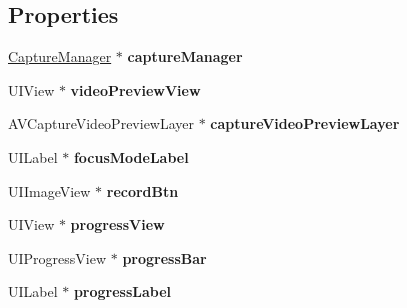\subsection*{Properties}
\begin{DoxyCompactItemize}
\item 
\hypertarget{category_k_z_camera_view_07_08_a202ff49b661861c8081b7f411008a7b7}{}\hyperlink{interface_capture_manager}{Capture\+Manager} $\ast$ {\bfseries capture\+Manager}\label{category_k_z_camera_view_07_08_a202ff49b661861c8081b7f411008a7b7}

\item 
\hypertarget{category_k_z_camera_view_07_08_ade4bbfffec8ef7634e9141f4aee79478}{}U\+I\+View $\ast$ {\bfseries video\+Preview\+View}\label{category_k_z_camera_view_07_08_ade4bbfffec8ef7634e9141f4aee79478}

\item 
\hypertarget{category_k_z_camera_view_07_08_aabdee2e18cb4074c218bf6b0b893eeb7}{}A\+V\+Capture\+Video\+Preview\+Layer $\ast$ {\bfseries capture\+Video\+Preview\+Layer}\label{category_k_z_camera_view_07_08_aabdee2e18cb4074c218bf6b0b893eeb7}

\item 
\hypertarget{category_k_z_camera_view_07_08_ab3a487d5969b702a208f641f13f2af19}{}U\+I\+Label $\ast$ {\bfseries focus\+Mode\+Label}\label{category_k_z_camera_view_07_08_ab3a487d5969b702a208f641f13f2af19}

\item 
\hypertarget{category_k_z_camera_view_07_08_a5b621375f9c96b2f2a57d246aebf7fc5}{}U\+I\+Image\+View $\ast$ {\bfseries record\+Btn}\label{category_k_z_camera_view_07_08_a5b621375f9c96b2f2a57d246aebf7fc5}

\item 
\hypertarget{category_k_z_camera_view_07_08_ab22146d5b06302170e106d0c672537d4}{}U\+I\+View $\ast$ {\bfseries progress\+View}\label{category_k_z_camera_view_07_08_ab22146d5b06302170e106d0c672537d4}

\item 
\hypertarget{category_k_z_camera_view_07_08_ad3c88cb69fa398dd163405ee11469f6a}{}U\+I\+Progress\+View $\ast$ {\bfseries progress\+Bar}\label{category_k_z_camera_view_07_08_ad3c88cb69fa398dd163405ee11469f6a}

\item 
\hypertarget{category_k_z_camera_view_07_08_ad7ba98e64b8bc53c204e5bf7b986c576}{}U\+I\+Label $\ast$ {\bfseries progress\+Label}\label{category_k_z_camera_view_07_08_ad7ba98e64b8bc53c204e5bf7b986c576}


\end{DoxyCompactItemize}
